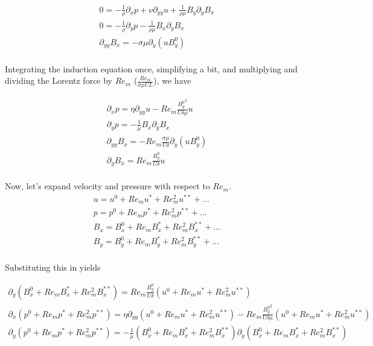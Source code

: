 \documentclass[11pt]{article}
\newcommand{\PD}{\partial}
\begin{document}
\begin{equation}\begin{aligned}
0 = -\frac{1}{\rho} \PD_x p + \nu \PD_{yy} u + \frac{1}{\rho \mu} B_y \PD_y B_x  \\
0 = -\frac{1}{\rho} \PD_y p - \frac{1}{\rho \mu} B_x \PD_y B_x \\
\PD_{yy} B_x = - \sigma \mu \PD_y (u B_y^0) \\
\end{aligned} \end{equation}

Integrating the induction equation once, simplifying a bit, and multiplying and dividing
the Lorentz force by $Re_m$ ($\frac{Re_m}{\sigma \mu U L}$), we have

\begin{equation}\begin{aligned}
\PD_x p = \eta \PD_{yy} u - Re_m \frac{{B_y^0}^2}{U \delta \mu} u \\
\PD_y p = - \frac{1}{\mu} B_x \PD_y B_x \\
\PD_{yy} B_x = - Re_m \frac{\sigma \mu}{U \delta} \PD_y (u B_y^0) \\
\PD_{y} B_x = Re_m \frac{B_y^0}{U \delta} u \\
\end{aligned} \end{equation}

Now, let's expand velocity and pressure with respect to $Re_m$.
\begin{equation}\begin{aligned}
	u = u^0 + Re_m u^* + Re_m^2 u^{**} + \hdots \\
	p = p^0 + Re_m p^* + Re_m^2 p^{**} + \hdots \\
	B_x = B_x^0 + Re_m B_x^* + Re_m^2 B_x^{**} + \hdots \\
	B_y = B_y^0 + Re_m B_y^* + Re_m^2 B_y^{**} + \hdots \\
\end{aligned} \end{equation}

Substituting this in yields

\begin{equation}\begin{aligned}
\PD_{y} (B_x^0 + Re_m B_x^* + Re_m^2 B_x^{**}) = Re_m \frac{B_y^0}{U \delta} (u^0 + Re_m u^* + Re_m^2 u^{**}) \\
\PD_x (p^0 + Re_m p^* + Re_m^2 p^{**}) = \eta \PD_{yy} (u^0 + Re_m u^* + Re_m^2 u^{**}) - Re_m \frac{{B_y^0}^2}{U \delta \mu} (u^0 + Re_m u^* + Re_m^2 u^{**}) \\
\PD_y (p^0 + Re_m p^* + Re_m^2 p^{**}) = - \frac{1}{\mu} (B_x^0 + Re_m B_x^* + Re_m^2 B_x^{**}) \PD_y (B_x^0 + Re_m B_x^* + Re_m^2 B_x^{**}) \\
\end{aligned} \end{equation}
\end{document}
